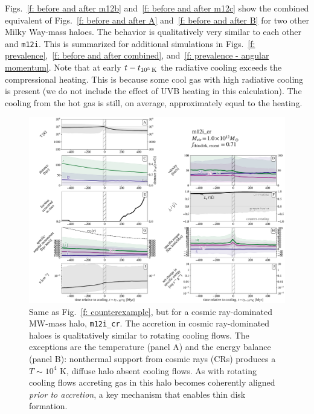\documentclass[fleqn,usenatbib]{mnras}
\newcommand{\tcools}{t_{10^5\,{\rm K}}}
\begin{document}
Figs.~\ref{f: before and after m12b} and~\ref{f: before and after m12c} show the combined equivalent of Figs.~\ref{f: before and after A} and~\ref{f: before and after B} for two other Milky Way-mass haloes.
The behavior is qualitatively very similar to each other and \texttt{m12i}.
This is summarized for additional simulations in Figs.~\ref{f: prevalence},~\ref{f: before and after combined}, and~\ref{f: prevalence - angular momentum}.
Note that at early $t - \tcools$ the radiative cooling exceeds the compressional heating.
This is because some cool gas with high radiative cooling is present (we do not include the effect of UVB heating in this calculation).
The cooling from the hot gas is still, on average, approximately equal to the heating.


\begin{figure}
\includegraphics[width=\textwidth]{figures/before_and_after/before_and_after_allone_m12i_cr.pdf}
\caption{
Same as Fig.~\ref{f: counterexample}, but for a cosmic ray-dominated MW-mass halo, \texttt{m12i\_cr}.
The accretion in cosmic ray-dominated haloes is qualitatively similar to rotating cooling flows.
The exceptions are the temperature (panel A) and the energy balance (panel B): nonthermal support from cosmic rays (CRs) produces a $T\sim 10^4$ K, diffuse halo absent cooling flows.
As with rotating cooling flows accreting gas in this halo becomes coherently aligned \textit{prior to accretion}, a key mechanism that enables thin disk formation.
}
\label{f: before and after m12i cr}
\end{figure}
\end{document}
